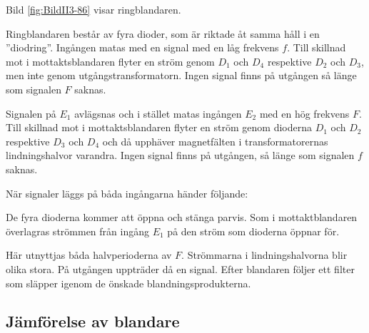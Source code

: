 Bild \ref{fig:BildII3-86} visar ringblandaren.

Ringblandaren består av fyra dioder, som är riktade åt samma håll i en
''diodring''.
Ingången matas med en signal med en låg frekvens \(f\).
Till skillnad mot i mottaktsblandaren flyter en ström genom \(D_1\) och \(D_4\)
respektive \(D_2\) och \(D_3\), men inte genom utgångstransformatorn.
Ingen signal finns på utgången så länge som signalen \(F\) saknas.

Signalen på \(E_1\) avlägsnas och i stället matas ingången \(E_2\) med
en hög frekvens \(F\).
Till skillnad mot i mottaktsblandaren flyter en ström genom dioderna \(D_1\)
och \(D_2\) respektive \(D_3\) och \(D_4\) och då upphäver magnetfälten i
transformatorernas lindningshalvor varandra.
Ingen signal finns på utgången, så länge som signalen \(f\) saknas.

När signaler läggs på båda ingångarna händer följande:

De fyra dioderna kommer att öppna och stänga parvis.
Som i mottaktblandaren överlagras strömmen från ingång \(E_1\) på den ström
som dioderna öppnar för.

Här utnyttjas båda halvperioderna av \(F\).
Strömmarna i lindningshalvorna blir olika stora.
På utgången uppträder då en signal.
Efter blandaren följer ett filter som släpper igenom de önskade
blandningsprodukterna.

\subsection{Jämförelse av blandare}

